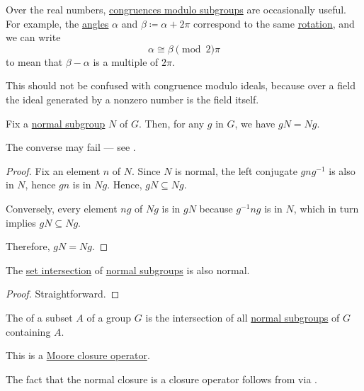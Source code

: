 \begin{remark}\label{rem:congruence_modulo_real_number}
  Over the real numbers, \hyperref[rem:congruence_modulo_substructure]{congruences modulo subgroups} are occasionally useful. For example, the \hyperref[def:angle]{angles} \( \alpha \) and \( \beta \coloneqq \alpha + 2\pi \) correspond to the same \hyperref[def:rigid_motion/rotation]{rotation}, and we can write
  \begin{equation*}
    \alpha \cong \beta \pmod 2\pi
  \end{equation*}
  to mean that \( \beta - \alpha \) is a multiple of \( 2\pi \).

  This should not be confused with congruence modulo ideals, because over a field the ideal generated by a nonzero number is the field itself.
\end{remark}

\begin{proposition}\label{thm:normal_subgroup_left_right_cosets}
  Fix a \hyperref[def:normal_subgroup]{normal subgroup} \( N \) of \( G \). Then, for any \( g \) in \( G \), we have \( gN = Ng \).
\end{proposition}
\begin{comments}
  \item The converse may fail --- see .
\end{comments}
\begin{proof}
  Fix an element \( n \) of \( N \). Since \( N \) is normal, the left conjugate \( gng^{-1} \) is also in \( N \), hence \( gn \) is in \( Ng \). Hence, \( gN \subseteq Ng \).

  Conversely, every element \( ng \) of \( Ng \) is in \( gN \) because \( g^{-1} n g \) is in \( N \), which in turn implies \( gN \subseteq Ng \).

  Therefore, \( gN = Ng \).
\end{proof}

\begin{lemma}\label{thm:intersection_of_normal_subgroups}
  The \hyperref[def:basic_set_operations/intersection]{set intersection} of \hyperref[def:normal_subgroup]{normal subgroups} is also normal.
\end{lemma}
\begin{proof}
  Straightforward.
\end{proof}

\begin{definition}\label{def:normal_closure}
  The  of a subset \( A \) of a group \( G \) is the intersection of all \hyperref[def:normal_subgroup]{normal subgroups} of \( G \) containing \( A \).

  This is a \hyperref[def:moore_closure_operator]{Moore closure operator}.
\end{definition}
\begin{defproof}
  The fact that the normal closure is a closure operator follows from  via .
\end{defproof}


